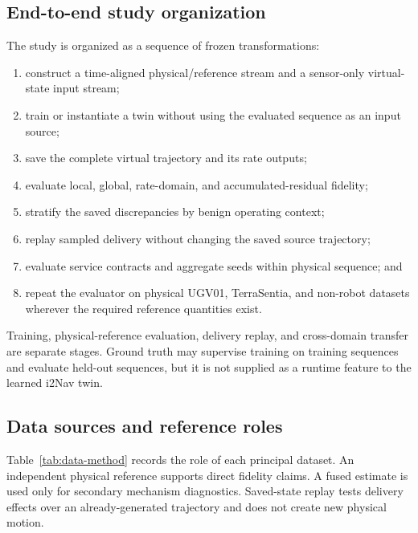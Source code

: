\documentclass[journal,onecolumn]{IEEEtran}
\begin{document}
\subsection{End-to-end study organization}
The study is organized as a sequence of frozen transformations:
\begin{enumerate}
\item construct a time-aligned physical/reference stream and a sensor-only virtual-state input stream;
\item train or instantiate a twin without using the evaluated sequence as an input source;
\item save the complete virtual trajectory and its rate outputs;
\item evaluate local, global, rate-domain, and accumulated-residual fidelity;
\item stratify the saved discrepancies by benign operating context;
\item replay sampled delivery without changing the saved source trajectory;
\item evaluate service contracts and aggregate seeds within physical sequence; and
\item repeat the evaluator on physical UGV01, TerraSentia, and non-robot datasets wherever the required reference quantities exist.
\end{enumerate}
Training, physical-reference evaluation, delivery replay, and cross-domain transfer are separate stages. Ground truth may supervise training on training sequences and evaluate held-out sequences, but it is not supplied as a runtime feature to the learned i2Nav twin.

\subsection{Data sources and reference roles}
Table~\ref{tab:data-method} records the role of each principal dataset. An independent physical reference supports direct fidelity claims. A fused estimate is used only for secondary mechanism diagnostics. Saved-state replay tests delivery effects over an already-generated trajectory and does not create new physical motion.
\end{document}
